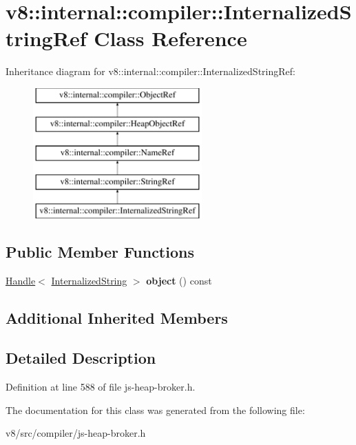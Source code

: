 \hypertarget{classv8_1_1internal_1_1compiler_1_1InternalizedStringRef}{}\section{v8\+:\+:internal\+:\+:compiler\+:\+:Internalized\+String\+Ref Class Reference}
\label{classv8_1_1internal_1_1compiler_1_1InternalizedStringRef}
Inheritance diagram for v8\+:\+:internal\+:\+:compiler\+:\+:Internalized\+String\+Ref\+:\begin{figure}[H]
\begin{center}
\leavevmode
\includegraphics[height=5.000000cm]{classv8_1_1internal_1_1compiler_1_1InternalizedStringRef}
\end{center}
\end{figure}
\subsection*{Public Member Functions}
\begin{DoxyCompactItemize}
\item 
\mbox{\label{classv8_1_1internal_1_1compiler_1_1InternalizedStringRef_ac51eda7c41a5a88aadf5d32bd5f45d99}} 
\mbox{\hyperlink{classv8_1_1internal_1_1Handle}{Handle}}$<$ \mbox{\hyperlink{classv8_1_1internal_1_1InternalizedString}{Internalized\+String}} $>$ {\bfseries object} () const
\end{DoxyCompactItemize}
\subsection*{Additional Inherited Members}


\subsection{Detailed Description}


Definition at line 588 of file js-\/heap-\/broker.\+h.



The documentation for this class was generated from the following file\+:\begin{DoxyCompactItemize}
\item 
v8/src/compiler/js-\/heap-\/broker.\+h\end{DoxyCompactItemize}
